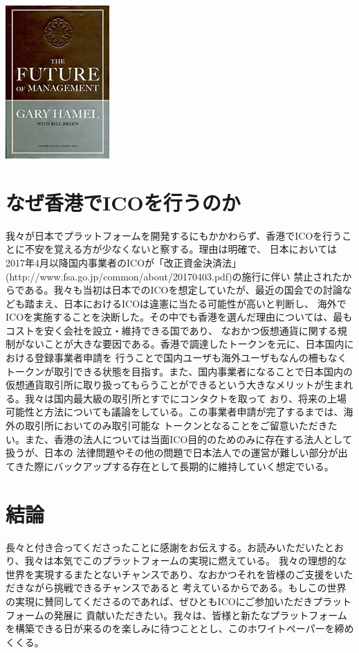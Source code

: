 \documentclass{jsarticle}
\begin{document}
	\includegraphics[scale=0.4]{img/thefutureofmanagement.jpg}
\section{なぜ香港でICOを行うのか}
我々が日本でプラットフォームを開発するにもかかわらず、香港でICOを行うことに不安を覚える方が少なくないと察する。理由は明確で、
日本においては2017年4月以降国内事業者のICOが「改正資金決済法」(http://www.fsa.go.jp/common/about/20170403.pdf)の施行に伴い
禁止されたからである。我々も当初は日本でのICOを想定していたが、最近の国会での討論なども踏まえ、日本におけるICOは違憲に当たる可能性が高いと判断し、
海外でICOを実施することを決断した。その中でも香港を選んだ理由については、最もコストを安く会社を設立・維持できる国であり、
なおかつ仮想通貨に関する規制がないことが大きな要因である。香港で調達したトークンを元に、日本国内における登録事業者申請を
行うことで国内ユーザも海外ユーザもなんの柵もなくトークンが取引できる状態を目指す。また、国内事業者になることで日本国内の
仮想通貨取引所に取り扱ってもらうことができるという大きなメリットが生まれる。我々は国内最大級の取引所とすでにコンタクトを取って
おり、将来の上場可能性と方法についても議論をしている。この事業者申請が完了するまでは、海外の取引所においてのみ取引可能な
トークンとなることをご留意いただきたい。また、香港の法人については当面ICO目的のためのみに存在する法人として扱うが、日本の
法律問題やその他の問題で日本法人での運営が難しい部分が出てきた際にバックアップする存在として長期的に維持していく想定でいる。
\section{結論}
長々と付き合ってくださったことに感謝をお伝えする。お読みいただいたとおり、我々は本気でこのプラットフォームの実現に燃えている。
我々の理想的な世界を実現するまたとないチャンスであり、なおかつそれを皆様のご支援をいただきながら挑戦できるチャンスであると
考えているからである。もしこの世界の実現に賛同してくださるのであれば、ぜひともICOにご参加いただきプラットフォームの発展に
貢献いただきたい。我々は、皆様と新たなプラットフォームを構築できる日が来るのを楽しみに待つこととし、このホワイトペーパーを締めくくる。
\end{document}
